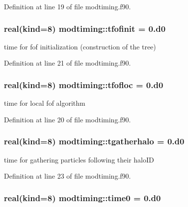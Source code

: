 Definition at line 19 of file modtiming.\+f90.

\subsubsection[{\texorpdfstring{tfofinit}{tfofinit}}]{\setlength{\rightskip}{0pt plus 5cm}real(kind=8) modtiming\+::tfofinit = 0.d0}\hypertarget{namespacemodtiming_a2c5b98c383953b670ee94c1022c2d822}{}\label{namespacemodtiming_a2c5b98c383953b670ee94c1022c2d822}


time for fof initialization (construction of the tree) 



Definition at line 21 of file modtiming.\+f90.

\subsubsection[{\texorpdfstring{tfofloc}{tfofloc}}]{\setlength{\rightskip}{0pt plus 5cm}real(kind=8) modtiming\+::tfofloc = 0.d0}\hypertarget{namespacemodtiming_a2574a405aaa97058f43e1e6b0b1d96e1}{}\label{namespacemodtiming_a2574a405aaa97058f43e1e6b0b1d96e1}


time for local fof algorithm 



Definition at line 20 of file modtiming.\+f90.

\subsubsection[{\texorpdfstring{tgatherhalo}{tgatherhalo}}]{\setlength{\rightskip}{0pt plus 5cm}real(kind=8) modtiming\+::tgatherhalo = 0.d0}\hypertarget{namespacemodtiming_a6a20740b33d07d1c6b9ed51953b48b0d}{}\label{namespacemodtiming_a6a20740b33d07d1c6b9ed51953b48b0d}


time for gathering particles following their halo\+ID 



Definition at line 23 of file modtiming.\+f90.

\subsubsection[{\texorpdfstring{time0}{time0}}]{\setlength{\rightskip}{0pt plus 5cm}real(kind=8) modtiming\+::time0 = 0.d0}\hypertarget{namespacemodtiming_aa15cbf8a08e28c5209481b3ed5f11090}{}\label{namespacemodtiming_aa15cbf8a08e28c5209481b3ed5f11090}


